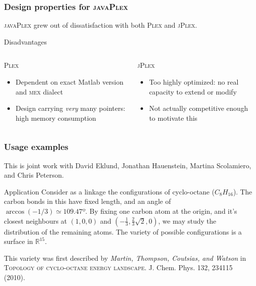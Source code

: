 \documentclass{beamer}
\newcommand\javaPlex{\textsc{javaPlex}\xspace}
\newcommand\jPlex{\textsc{jPlex}\xspace}
\newcommand\Plex{\textsc{Plex}\xspace}
\begin{document}
\begin{frame}
  \frametitle{Design properties for \javaPlex}
  
  \javaPlex grew out of dissatisfaction with both \Plex and \jPlex.

  \begin{block}{Disadvantages}
    \begin{columns}[t]
      \begin{column}{0.5\textwidth}
        \Plex
        \begin{itemize}
        \item Dependent on exact Matlab version and \textsc{mex} dialect
        \item Design carrying \emph{very} many pointers: high memory consumption
        \end{itemize}
      \end{column}
      \begin{column}{0.5\textwidth}
        \jPlex
        \begin{itemize}
        \item Too highly optimized: no real capacity to extend or modify
        \item Not actually competitive enough to motivate this
        \end{itemize}
      \end{column}
    \end{columns}
  \end{block}
\end{frame}

\begin{frame}
  \frametitle{Usage examples}
  
  This is joint work with David Eklund, Jonathan Hauenstein, Martina Scolamiero, and Chris Peterson.

  \begin{block}{Application}
    Consider as a linkage the configurations of cyclo-octane ($C_8H_{16}$). 
    The carbon bonds in this have fixed length, and an angle of $\arccos(-1/3)\simeq 109.47º$.
    By fixing one carbon atom at the origin, and it's closest neighbours at $(1,0,0)$ and $(-\frac13,\frac23\sqrt{2},0)$, we may study the distribution of the remaining atoms.
    The variety of possible configurations is a surface in $\mathbb R^{15}$.
  \end{block}
  This variety was first described by \textit{Martin, Thompson, Coutsias, and Watson} in \textsc{Topology of cyclo-octane energy landscape}. J. Chem. Phys. 132, 234115 (2010).
\end{frame}
\end{document}
